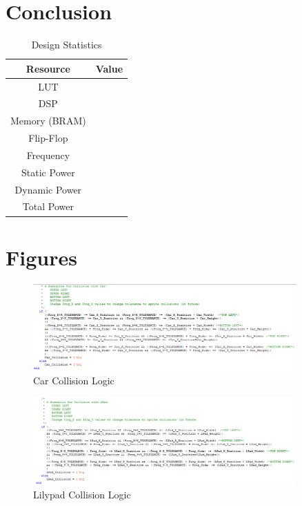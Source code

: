 \documentclass[journal, twocolumn, final,11pt,letterpaper]{IEEEtran}
\begin{document}
\section{Conclusion} 
\begin{table}[htbp]
	\centering
	\begin{tabular}{c|c}	%
		\toprule	%
		Resource & Value \\
		\midrule
		LUT & \\
		DSP & \\
		Memory (BRAM) & \\
		Flip-Flop & \\
		Frequency &  \\
		Static Power & \\
		Dynamic Power & \\
		Total Power & \\
		\bottomrule	%
	\end{tabular}%
	\caption{Design Statistics}
	\label{tab:design}
\end{table}



\clearpage
\onecolumn
\section{Figures}

\begin{figure}[H]
	\centering
	\includegraphics[width=0.9\textwidth]{car_collision.png}
	\caption{Car Collision Logic}
	\label{fig:car-collision}
\end{figure}

\begin{figure}[H]
	\centering
	\includegraphics[width=0.9\textwidth]{lilypad_collision.png}
	\caption{Lilypad Collision Logic}
	\label{fig:lilypad-collision}
\end{figure}
\end{document}

